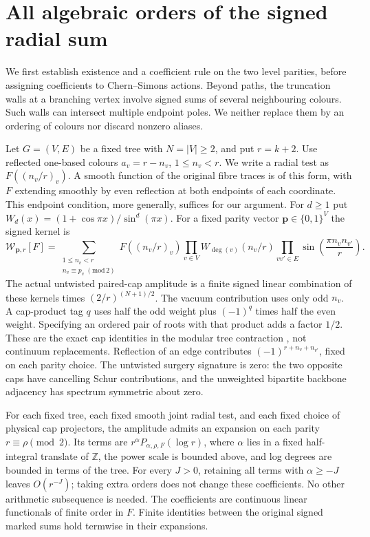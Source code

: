 \section{All algebraic orders of the signed radial sum}
\label{rad:section}

We first establish existence and a coefficient rule on the two level
parities, before assigning coefficients to Chern--Simons actions.
Beyond paths, the truncation walls at a branching vertex involve
signed sums of several neighbouring colours. Such walls can intersect
multiple endpoint poles. We neither replace them by an ordering of
colours nor discard nonzero aliases.

Let \(G=(V,E)\) be a fixed tree with \(N=|V|\ge2\), and put \(r=k+2\).
Use reflected one-based colours \(a_v=r-n_v\), \(1\le n_v<r\).
We write a radial test as \(F((n_v/r)_v)\). A smooth function of the
original fibre traces is of this form, with \(F\) extending smoothly
by even reflection at both endpoints of each coordinate. This
endpoint condition, more generally, suffices for our argument.
For \(d\ge1\) put \(W_d(x)=(1+\cos\pi x)/\sin^d(\pi x)\). For a fixed
parity vector \(\boldsymbol p\in\{0,1\}^V\) the signed kernel is
\begin{equation}
 \mathcal W_{\boldsymbol p,r}[F]=
 \sum_{\substack{1\le n_v<r\\n_v\equiv p_v\;(\mathrm{mod}\,2)}}
 F((n_v/r)_v)
 \prod_{v\in V}W_{\deg(v)}(n_v/r)
 \prod_{vv'\in E}\sin\!\left(\frac{\pi n_vn_{v'}}r\right).
 \label{rad:sum}
\end{equation}
The actual untwisted paired-cap amplitude is a finite signed linear
combination of these kernels times \((2/r)^{(N+1)/2}\).
The vacuum contribution uses only odd \(n_v\). A cap-product tag
\(q\) uses half the odd weight plus \((-1)^q\) times half the even
weight. Specifying an ordered pair of roots with that product
adds a factor \(1/2\). These are the exact cap identities in the
modular tree contraction \cite{GPPV}, not continuum replacements.
Reflection of an edge contributes \((-1)^{r+n_v+n_{v'}}\), fixed
on each parity choice. The untwisted surgery signature is zero:
the two opposite caps have cancelling Schur contributions, and the
unweighted bipartite backbone adjacency has spectrum symmetric
about zero.

\begin{theorem}\label{rad:thm}
For each fixed tree, each fixed smooth joint radial test, and each
fixed choice of physical cap projectors, the amplitude admits an
expansion on each parity \(r\equiv\rho\pmod2\). Its terms are
\(r^\alpha P_{\alpha,\rho,F}(\log r)\), where \(\alpha\) lies in a
fixed half-integral translate of \(\mathbb Z\), the power scale is
bounded above, and log degrees are bounded in terms of the tree.
For every \(J>0\), retaining all terms with \(\alpha\ge-J\) leaves
\(O(r^{-J})\); taking extra orders does not change these coefficients.
No other arithmetic subsequence is needed. The coefficients are
continuous linear functionals of finite order in \(F\). Finite
identities between the original signed marked sums hold termwise
in their expansions.
\end{theorem}

